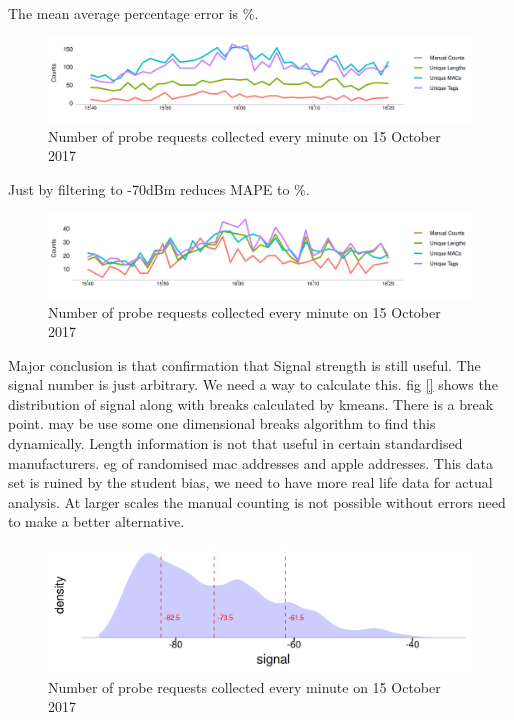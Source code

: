 The mean average percentage error is \%.

\begin{figure}
  \includegraphics{images/ucl-comparison-before.png}
  \caption{Number of probe requests collected every minute on 15 October 2017}
  \label{figure:collection:ucl:config}
\end{figure}

Just by filtering to -70dBm reduces MAPE to \%.

\begin{figure}
  \includegraphics{images/ucl-comparison-after.png}
  \caption{Number of probe requests collected every minute on 15 October 2017}
  \label{figure:collection:ucl:config}
\end{figure}

Major conclusion is that confirmation that Signal strength is still useful.
The signal number is just arbitrary. We need a way to calculate this.
fig \ref{} shows the distribution of signal along with breaks calculated by kmeans.
There is a break point. may be use some one dimensional breaks algorithm to find this dynamically.
Length information is not that useful in certain standardised manufacturers.
eg of randomised mac addresses and apple addresses.
This data set is ruined by the student bias, we need to have more real life data for actual analysis.
At larger scales the manual counting is not possible without errors need to make a better alternative.

\begin{figure}
\includegraphics[trim={5 5 5 5},clip]{images/ucl-signal-dist.png}
  \caption{Number of probe requests collected every minute on 15 October 2017}
  \label{figure:collection:ucl:signal}
\end{figure}
\marginnote{\textit{} }

